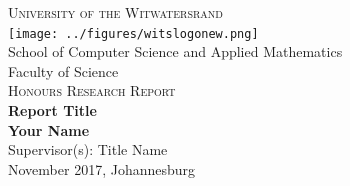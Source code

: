 \begin{titlepage}
\begin{center}
\vspace*{0.5cm}
\textsc{\large University of the Witwatersrand}\\
\texttt{[image: ../figures/witslogonew.png]}~\\[0.2cm]
\large School of Computer Science and Applied Mathematics\\
\large Faculty of Science\\
\textsc{\Large Honours Research Report}\\[1.8cm]
\textbf{\huge {Report Title}} \\[1.5cm]
\textbf{\Large Your Name} \\[7cm]
\vfill 
Supervisor(s): Title Name\\[1cm]

{\normalsize {November 2017, Johannesburg}}
\end{center}
\end{titlepage}
